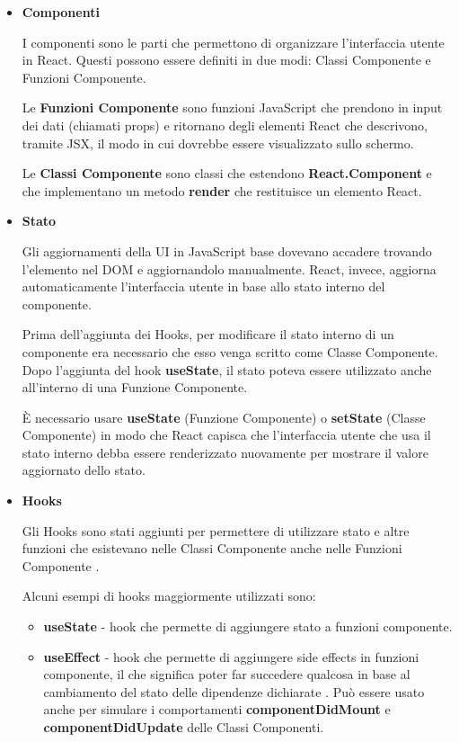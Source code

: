 \documentclass[a4paper,12pt]{report}
\begin{document}
				\begin{itemize}
				\item \textbf{Componenti}

				I componenti sono le parti che permettono di organizzare l'interfaccia utente in React. Questi possono essere definiti in due modi: Classi Componente e Funzioni Componente. \cite{componentireact} 

				Le \textbf{Funzioni Componente} sono funzioni JavaScript che prendono in input dei dati (chiamati props) e ritornano degli elementi React che descrivono, tramite JSX, il modo in cui dovrebbe essere visualizzato sullo schermo. \cite{tipicomponenti} 

				Le \textbf{Classi Componente} sono classi che estendono \textbf{React.Component} e che implementano un metodo \textbf{render} che restituisce un elemento React. \cite{tipicomponenti}

				\item \textbf{Stato} 

				Gli aggiornamenti della UI in JavaScript base dovevano accadere trovando l'elemento nel DOM e aggiornandolo manualmente. React, invece, aggiorna automaticamente l'interfaccia utente in base allo stato interno del componente. 

Prima dell'aggiunta dei Hooks, per modificare il stato interno di un componente era necessario che esso venga scritto come Classe Componente. Dopo l'aggiunta del hook \textbf{useState}, il stato poteva essere utilizzato anche all'interno di una Funzione Componente. 

È necessario usare \textbf{useState} (Funzione Componente) o \textbf{setState} (Classe Componente) in modo che React capisca che l'interfaccia utente che usa il stato interno debba essere renderizzato nuovamente per mostrare il valore aggiornato dello stato. \cite{statoreact} 

				\item \textbf{Hooks} 

				Gli Hooks sono stati aggiunti per permettere di utilizzare stato e altre funzioni che esistevano nelle Classi Componente anche nelle Funzioni Componente \cite{hooksreact}. 
				
				Alcuni esempi di hooks maggiormente utilizzati sono: 

				\begin{itemize}
				\item \textbf{useState} - hook che permette di aggiungere stato a funzioni componente.
				\item \textbf{useEffect} - hook che permette di aggiungere side effects in funzioni componente, il che significa poter far succedere qualcosa in base al cambiamento del stato delle dipendenze dichiarate . Può essere usato anche per simulare i comportamenti \textbf{componentDidMount} e \textbf{componentDidUpdate} delle Classi Componenti.


\end{itemize}
\end{itemize}
\end{document}
